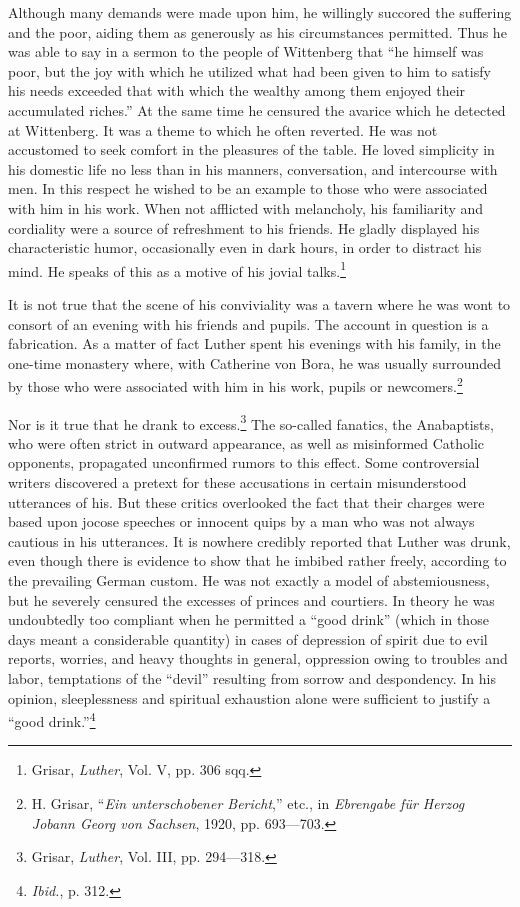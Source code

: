 Although many demands were made upon him, he willingly succored the suffering
and the poor, aiding them as generously as his
circumstances permitted. Thus he was able to say in a sermon to
the people of Wittenberg that “he himself was poor, but the joy
with which he utilized what had been given to him to satisfy his
needs exceeded that with which the wealthy among them enjoyed
their accumulated riches.” At the same time he censured the avarice
which he detected at Wittenberg. It was a theme to which he often
reverted. He was not accustomed to seek comfort in the pleasures
of the table. He loved simplicity in his domestic life no less than in
his manners, conversation, and intercourse with men. In this respect
he wished to be an example to those who were associated with him
in his work. When not afflicted with melancholy, his familiarity and
cordiality were a source of refreshment to his friends. He gladly displayed
his characteristic humor, occasionally even in dark hours, in
order to distract his mind. He speaks of this as a motive of his
jovial talks.\footnote{Grisar, \textit{Luther}, Vol. V, pp. 306 sqq.}

It is not true that the scene of his conviviality was a tavern where
he was wont to consort of an evening with his friends and pupils.
The account in question is a fabrication. As a matter of fact Luther
spent his evenings with his family, in the one-time monastery where,
with Catherine von Bora, he was usually surrounded by those who
were associated with him in his work, pupils or newcomers.\footnote
{H. Grisar, “\textit{Ein unterschobener Bericht},” etc., in \textit{Ebrengabe für Herzog Jobann Georg
von Sachsen}, 1920, pp. 693—703.}

Nor is it true that he drank to excess.\footnote{Grisar, \textit{Luther}, Vol. III, pp. 294—318.}
 The so-called fanatics, the
Anabaptists, who were often strict in outward appearance, as well
as misinformed Catholic opponents, propagated unconfirmed rumors
to this effect. Some controversial writers discovered a pretext for
these accusations in certain misunderstood utterances of his. But
these critics overlooked the fact that their charges were based upon
jocose speeches or innocent quips by a man who was not always
cautious in his utterances. It is nowhere credibly reported that
Luther was drunk, even though there is evidence to show that he
imbibed rather freely, according to the prevailing German custom.
He was not exactly a model of abstemiousness, but he severely censured
the excesses of princes and courtiers. In theory he was undoubtedly
too compliant when he permitted a “good drink” (which
in those days meant a considerable quantity) in cases of depression
of spirit due to evil reports, worries, and heavy thoughts in general,
oppression owing to troubles and labor, temptations of the “devil”
resulting from sorrow and despondency. In his opinion, sleeplessness
and spiritual exhaustion alone were sufficient to justify a ``good
drink.''\footnote{\textit{Ibid.}, p. 312.}


